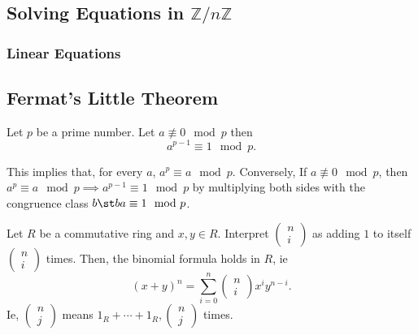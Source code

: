 \documentclass[12pt,oneside]{article}
\begin{document}
\subsection{Solving Equations in \texorpdfstring{$\mathbb{Z}/n\mathbb{Z}$}{Z/nZ}}

\begin{definition}
  
\end{definition}
\subsubsection{Linear Equations}
\newpage
\subsection{Fermat's Little Theorem}
\begin{theorem}\label{thm:fermatslittle}
  Let $p$  be a prime number. Let $a\not\equiv 0\mod p$ then \[a^{p-1}\equiv 1 \mod p.\]
\end{theorem}

\begin{remark}
  This implies that, for every $a$, $a^p \equiv a \mod p$. Conversely, If $a \not\equiv 0 \mod p$, then $a^p \equiv a \mod p \implies a^{p-1} \equiv 1 \mod p$ by multiplying both sides with the congruence class $b \st ba \equiv 1 \mod p$.
\end{remark}

\begin{lemma}\label{lemma:fermatslittlelemma}
  Let $R$ be a commutative ring and $x,y \in R$. Interpret $\begin{pmatrix}
    n\\
    i
  \end{pmatrix}$ as adding $1$ to itself $\begin{pmatrix}
    n\\
    i
  \end{pmatrix}$ times. Then, the binomial formula holds in $R$, ie\[(x+y)^{n} = \sum_{i=0}^{n} \begin{pmatrix}
    n\\
    i
  \end{pmatrix}x^{i}y^{n-i}.\]
  Ie, $\begin{pmatrix}
    n\\
    j
  \end{pmatrix}$ means $1_R + \cdots + 1_R, \begin{pmatrix}
    n\\j
  \end{pmatrix}$ times.
\end{lemma}
\end{document}

